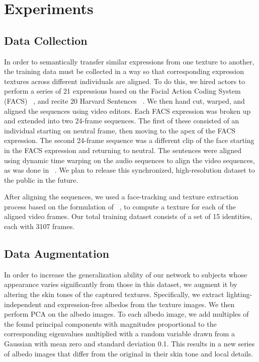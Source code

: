 
\section{Experiments}

\subsection{Data Collection}

In order to semantically transfer similar expressions from one texture to another, the training data must be collected in a way so that 
corresponding expression textures across different individuals are aligned.  To do this, we hired actors to perform a series of 21 expressions based on the Facial Action Coding System (FACS) ~\cite{Ekman:1978}, and recite 20 Harvard Sentences ~\cite{HarvardSent:1969}. We then hand cut, warped, and aligned the sequences using video editors.  Each FACS expression was broken
up and extended into two 24-frame sequences.  The first of these consisted of an individual starting on neutral frame, then moving to the apex of the FACS expression.
The second 24-frame sequence was a different clip of the face starting in the FACS expression and returning to neutral.  The sentences were aligned
using dynamic time warping on the audio sequences to align the video sequences, as was done in ~\cite{olszewski2016high}. We plan to release this synchronized, high-resolution dataset to the public in the future. 

After aligning the sequences, we used a face-tracking and texture extraction process based on the formulation of ~\cite{f2f}, to compute a texture
for each of the aligned video frames.  Our total training dataset consists of a set of 15 identities, each with 3107 frames.

\subsection{Data Augmentation}
In order to increase the generalization ability of our network to subjects whose appearance varies significantly from those in this dataset, we augment it by altering the skin tones of the captured textures. Specifically, we extract lighting-independent and expression-free albedos from the texture images.
We then perform PCA on the albedo images. To each albedo image, we add multiples of the found principal components with magnitudes proportional to the corresponding eigenvalues multiplied with a random variable drawn from a Gaussian with mean zero and standard deviation 0.1. This results in a new series of albedo images that differ from the original in their skin tone and local details.

